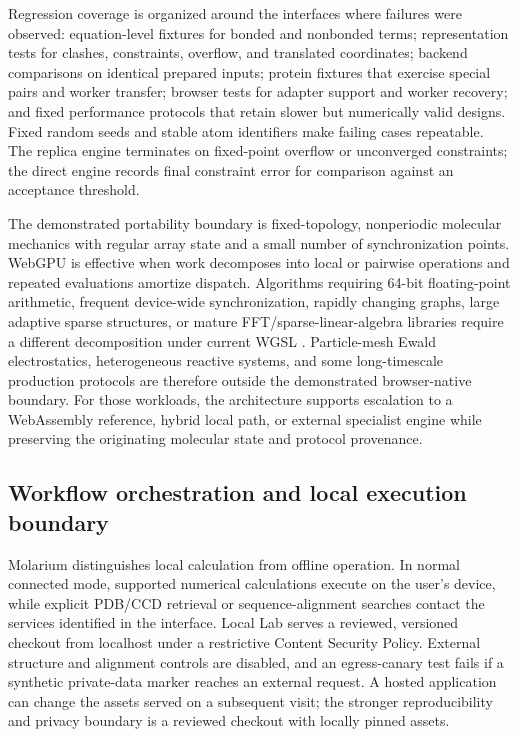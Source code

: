 \documentclass[11pt]{article}
\begin{document}
\begin{small}
Regression coverage is organized around the interfaces where failures were observed: equation-level fixtures for bonded and nonbonded terms; representation tests for clashes, constraints, overflow, and translated coordinates; backend comparisons on identical prepared inputs; protein fixtures that exercise special pairs and worker transfer; browser tests for adapter support and worker recovery; and fixed performance protocols that retain slower but numerically valid designs. Fixed random seeds and stable atom identifiers make failing cases repeatable. The replica engine terminates on fixed-point overflow or unconverged constraints; the direct engine records final constraint error for comparison against an acceptance threshold.

The demonstrated portability boundary is fixed-topology, nonperiodic molecular mechanics with regular array state and a small number of synchronization points. WebGPU is effective when work decomposes into local or pairwise operations and repeated evaluations amortize dispatch. Algorithms requiring 64-bit floating-point arithmetic, frequent device-wide synchronization, rapidly changing graphs, large adaptive sparse structures, or mature FFT/sparse-linear-algebra libraries require a different decomposition under current WGSL \citep{webgpuWGSL2026}. Particle-mesh Ewald electrostatics, heterogeneous reactive systems, and some long-timescale production protocols are therefore outside the demonstrated browser-native boundary. For those workloads, the architecture supports escalation to a WebAssembly reference, hybrid local path, or external specialist engine while preserving the originating molecular state and protocol provenance.

\subsection{Workflow orchestration and local execution boundary}

Molarium distinguishes local calculation from offline operation. In normal connected mode, supported numerical calculations execute on the user's device, while explicit PDB/CCD retrieval or sequence-alignment searches contact the services identified in the interface. Local Lab serves a reviewed, versioned checkout from localhost under a restrictive Content Security Policy. External structure and alignment controls are disabled, and an egress-canary test fails if a synthetic private-data marker reaches an external request. A hosted application can change the assets served on a subsequent visit; the stronger reproducibility and privacy boundary is a reviewed checkout with locally pinned assets.


\end{small}
\end{document}
